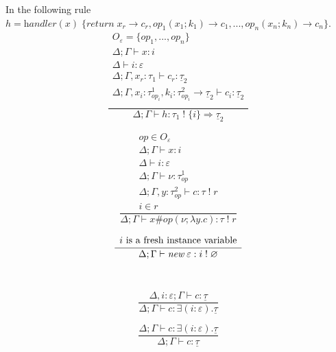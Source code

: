 \documentclass[12pt]{article}
\newcommand\eff[0]{\varepsilon}
\newcommand\Op[0]{O}
\newcommand\op[0]{op}
\newcommand\pty[1]{\ty^1_{#1}}
\newcommand\rty[1]{\ty^2_{#1}}
\newcommand\ty[0]{\tau}
\newcommand\tarr[2]{#1 \rightarrow #2}
\newcommand\thandler[2]{#1 \Rightarrow #2}
\newcommand\cty[0]{\underline{\ty}}
\newcommand\aty[2]{#1 \; ! \; #2}
\newcommand\texists[3]{\exists(#1:#2) . #3}
\newcommand\val[0]{\nu}
\newcommand\vhandleri[2]{\textit{handler} ( #1 ) \; \{#2\}}
\newcommand\comp[0]{c}
\newcommand\copi[5]{#1 \# #2(#3 ; \lambda #4 . #5)}
\newcommand\cnew[1]{\textit{new} \; #1}
\begin{document}
In the following rule \\$h = \vhandleri{x}{
		\textit{return} \; x_r \rightarrow \comp_r,
		\op_1(x_1 ; k_1) \rightarrow \comp_1,
		...,
		\op_n(x_n ; k_n) \rightarrow \comp_n
	}$.
\[\frac{
	\begin{array}{l}
	\Op_\eff = \{ op_1, ..., op_n \} \\
	\Delta;\Gamma \vdash x : i \\
	\Delta \vdash i : \eff \\
	\Delta;\Gamma, x_r : \ty_1 \vdash \comp_r : \cty_2 \\
	\Delta;\Gamma, x_i : \pty{\op_i}, k_i : \tarr{\rty{\op_i}}{\cty_2} \vdash \comp_i : \cty_2 \\
	\end{array}
}{
	\Delta;\Gamma \vdash h :
	\thandler{\aty{\ty_1}{\{i\}}}{\cty_2}
}\]

\begin{minipage}{0.5\textwidth}
\[\frac{
	\begin{array}{l}
	\op \in \Op_\eff\\
	\Delta;\Gamma \vdash x : i \\
	\Delta \vdash i : \eff \\
	\Delta;\Gamma \vdash \val : \pty{\op} \\
	\Delta;\Gamma , y : \rty{\op} \vdash \comp : \aty{\ty}{r} \\
	i \in r
	\end{array}
}{
	\Delta;\Gamma \vdash \copi{x}{\op}{\val}{y}{\comp} : \aty{\ty}{r}
}\]
\vspace{10pt}
\end{minipage}
\begin{minipage}{0.5\textwidth}
\[\frac{
	\begin{array}{l}
	i\textnormal{ is a fresh instance variable}
	\end{array}
}{
	\Delta;\Gamma \vdash \cnew{\eff} : \aty{i}{\varnothing}
}\]
\vspace{10pt}
\end{minipage}
\\
\begin{minipage}{0.5\textwidth}
\[\frac{
	\Delta,i:\eff;\Gamma \vdash \comp : \cty
}{
	\Delta;\Gamma \vdash \comp : \texists{i}{\eff}{\cty}
}\]
\end{minipage}
\begin{minipage}{0.5\textwidth}
\[\frac{
	\Delta;\Gamma \vdash \comp : \texists{i}{\eff}{\cty}
}{
	\Delta;\Gamma \vdash \comp : \cty
}\]
\end{minipage}
\end{document}
